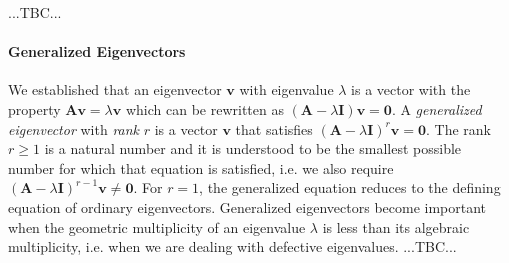 
%



...TBC...




\paragraph{Generalized Eigenvectors} We established that an eigenvector $\mathbf{v}$ with eigenvalue $\lambda$ is a vector with the property $\mathbf{A v} = \lambda \mathbf{v}$ which can be rewritten as $(\mathbf{A} - \lambda \mathbf{I}) \mathbf{v} = \mathbf{0}$. A \emph{generalized eigenvector} with \emph{rank} $r$ is a vector $\mathbf{v}$ that satisfies $(\mathbf{A} - \lambda \mathbf{I})^r \mathbf{v} = \mathbf{0}$. The rank $r \geq 1$ is a natural number and it is understood to be the smallest possible number for which that equation is satisfied, i.e. we also require  $(\mathbf{A} - \lambda \mathbf{I})^{r-1} \mathbf{v} \neq \mathbf{0}$. For $r = 1$, the generalized equation reduces to the defining equation of ordinary eigenvectors. Generalized eigenvectors become important when the geometric multiplicity of an eigenvalue $\lambda$ is less than its algebraic multiplicity, i.e. when we are dealing with defective eigenvalues.   ...TBC...


